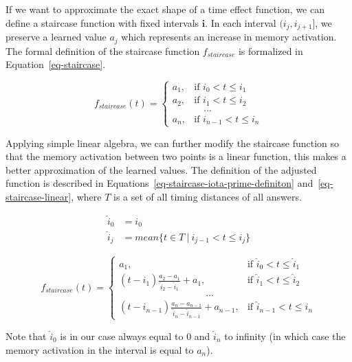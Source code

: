 If we want to approximate the exact shape of a time effect function, we can define a staircase function with fixed intervals $\mathbf{i}$. In each interval $(i_j, i_{j+1}]$, we preserve a learned value $a_j$ which represents an increase in memory activation. The formal definition of the staircase function $f_{\mathit{staircase}}$ is formalized in Equation~\ref{eq-staircase}.

\begin{equation} \label{eq-staircase}
  f_{\mathit{staircase}}(t) = \begin{cases}
            a_1, & \text{if } i_0 < t \leq i_1 \\
            a_2, & \text{if } i_1 < t \leq i_2 \\
                 & \hspace{1em} \dots \\
            a_n, & \text{if } i_{n-1} < t \leq i_n
         \end{cases}
\end{equation}

Applying simple linear algebra, we can further modify the staircase function so that the memory activation between two points is a linear function, this makes a better approximation of the learned values. The definition of the adjusted function is described in Equations~\ref{eq-staircase-iota-prime-definiton} and~\ref{eq-staircase-linear}, where $T$ is a set of all timing distances of all answers.

\begin{equation} \label{eq-staircase-iota-prime-definiton}
\begin{split}
  \hat{i}_0 &= i_0 \\
  \hat{i}_j &= \mathit{mean}\{t \in T~|~i_{j-1} < t \leq i_j\}
\end{split}
\end{equation}

\begin{equation} \label{eq-staircase-linear}
  f_{\mathit{staircase}}(t) = \begin{cases}
            a_1, & \text{if } \hat{i}_0 < t \leq \hat{i}_1 \\
            (t - \hat{i}_1) \frac{a_2 - a_1}{\hat{i}_2 - \hat{i}_1} + a_1, & \text{if } \hat{i}_1 < t \leq \hat{i}_2 \\
            \hspace{9em} \dots \\
            (t - \hat{i}_{n-1}) \frac{a_n - a_{n-1}}{\hat{i}_n - \hat{i}_{n-1}} + a_{n-1}, & \text{if } \hat{i}_{n-1} < t \leq \hat{i}_n     
         \end{cases}
\end{equation}

Note that $\hat{i}_0$ is in our case always equal to $0$ and $\hat{i}_n$ to infinity (in which case the memory activation in the interval is equal to $a_n$).
